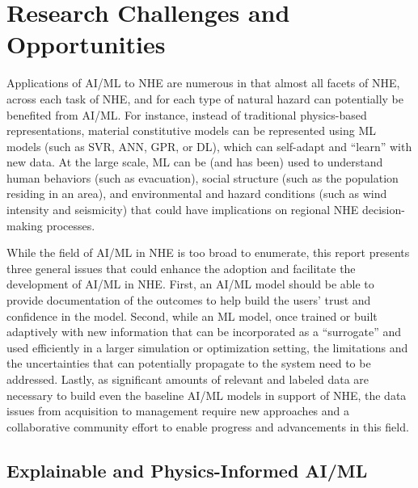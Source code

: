 \section{Research Challenges and Opportunities}
\label{sec:ai_gaps}

Applications of AI/ML to NHE are numerous in that almost all facets of NHE, across each task of NHE, and for each type of natural hazard can potentially be benefited from AI/ML. For instance, instead of traditional physics-based representations, material constitutive models can be represented using ML models (such as SVR, ANN, GPR, or DL), which can self-adapt and ``learn'' with new data. At the large scale, ML can be (and has been) used to understand human behaviors (such as evacuation), social structure (such as the population residing in an area), and environmental and hazard conditions (such as wind intensity and seismicity) that could have implications on regional NHE decision-making processes.

While the field of AI/ML in NHE is too broad to enumerate, this report presents three general issues that could enhance the adoption and facilitate the development of AI/ML in NHE. First, an AI/ML model should be able to provide documentation of the outcomes to help build the users' trust and confidence in the model. Second, while an ML model, once trained or built adaptively with new information that can be incorporated as a ``surrogate'' and used efficiently in a larger simulation or optimization setting, the limitations and the uncertainties that can potentially propagate to the system need to be addressed. Lastly, as significant amounts of relevant and labeled data are necessary to build even the baseline AI/ML models in support of NHE, the data issues from acquisition to management require new approaches and a collaborative community effort to enable progress and advancements in this field. 

\subsection{Explainable and Physics-Informed AI/ML}

